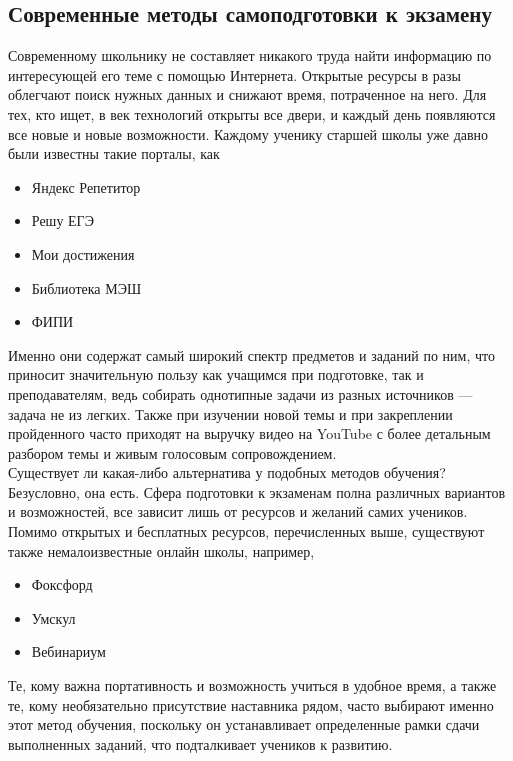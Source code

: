 \documentclass[a4paper, 12pt]{extarticle}
\begin{document}
\subsection{Современные методы самоподготовки к экзамену}
\vspace{2mm}
Современному школьнику не составляет никакого труда найти информацию по
интересующей его теме с помощью Интернета. Открытые ресурсы в разы облегчают
поиск нужных данных и снижают время, потраченное на него. Для тех, кто ищет, в век
технологий открыты все двери, и каждый день появляются все новые и новые
возможности. Каждому ученику старшей школы уже давно были известны такие
порталы, как
\begin{itemize}
    \item {\small Яндекс Репетитор\par}
    \item {\small Решу ЕГЭ\par}
    \item {\small Мои достижения\par}
    \item {\small Библиотека МЭШ\par}
    \item {\small ФИПИ\par}

\end{itemize}
Именно они содержат самый широкий спектр предметов и заданий по ним, что
приносит значительную пользу как учащимся при подготовке, так и преподавателям, ведь собирать
однотипные задачи из разных источников — задача не из легких. Также при изучении
новой темы и при закреплении пройденного часто приходят на выручку видео на
YouTube с более детальным разбором темы и живым голосовым сопровождением.
\\

Существует ли какая-либо альтернатива у подобных методов обучения?
Безусловно, она есть. Сфера подготовки к экзаменам полна различных вариантов
и возможностей, все зависит лишь от ресурсов и желаний самих учеников.
Помимо открытых и бесплатных ресурсов, перечисленных выше, существуют также
немалоизвестные онлайн школы, например,
\begin{itemize}
    \item {\small Фоксфорд\par}
    \item {\small Умскул\par}
    \item {\small Вебинариум\par}
\end{itemize}
Те, кому важна портативность и возможность учиться в удобное время, а
также те, кому необязательно присутствие наставника рядом, часто выбирают именно этот
метод обучения, поскольку он устанавливает определенные рамки сдачи выполненных
заданий, что подталкивает учеников к развитию.
\\
\end{document}
